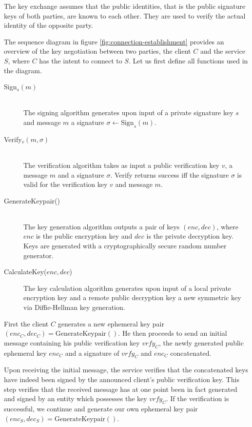 The key exchange assumes that the public identities, that is the public signature keys of both parties, are known to each other.
They are used to verify the actual identity of the opposite party.

The sequence diagram in figure \ref{fig:connection-establishment} provides an overview of the key negotiation between two parties, the client $C$ and the service $S$, where $C$ has the intent to connect to $S$.
Let us first define all functions used in the diagram.

\begin{description}
    \item[Sign$_s(m)$]\hfill\\
        The signing algorithm generates upon input of a private signature key $s$ and message $m$ a signature $\sigma \leftarrow \text{Sign}_{s}(m)$.
    \item[Verify$_v(m, \sigma)$]\hfill\\
        The verification algorithm takes as input a public verification key $v$, a message $m$ and a signature $\sigma$.
        Verify returns success iff the signature $\sigma$ is valid for the verification key $v$ and message $m$.
    \item[GenerateKeypair()]\hfill\\
        The key generation algorithm outputs a pair of keys $(enc, dec)$, where $enc$ is the public encryption key and $dec$ is the private decryption key.
        Keys are generated with a cryptographically secure random number generator.
    \item[CalculateKey($enc, dec$)]
        The key calculation algorithm generates upon input of a local private encryption key and a remote public decryption key a new symmetric key via Diffie-Hellman key generation.
\end{description}

First the client $C$ generates a new ephemeral key pair $(enc_C, dec_C) = \text{GenerateKeypair}()$.
He then proceeds to send an initial message containing his public verification key $vrfy_C$, the newly generated public ephemeral key $enc_C$ and a signature of $vrfy_C$ and $enc_C$ concatenated.

Upon receiving the initial message, the service verifies that the concatenated keys have indeed been signed by the announced client's public verification key.
This step verifies that the received message has at one point been in fact generated and signed by an entity which possesses the key $vrfy_C$.
If the verification is successful, we continue and generate our own ephemeral key pair $(enc_S, dec_S) = \text{GenerateKeypair}()$.

